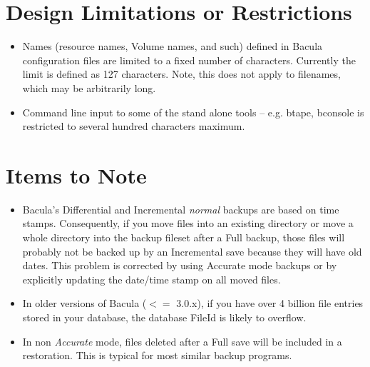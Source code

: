 \section{Design Limitations or Restrictions}

\begin{itemize}
\item Names (resource names, Volume names, and such) defined in Bacula 
   configuration files are limited to a fixed number of
   characters.  Currently the limit is defined as 127 characters.  Note,
   this does not apply to filenames, which may be arbitrarily long.
\item Command line input to some of the stand alone tools -- e.g. btape,
   bconsole is restricted to several hundred characters maximum.
\end{itemize}

\section{Items to Note}
\begin{itemize}
\item Bacula's Differential and Incremental \textsl{normal} backups are based
  on time stamps.  Consequently, if you move files into an existing directory
  or move a whole directory into the backup fileset after a Full backup, those
  files will probably not be backed up by an Incremental save because they will
  have old dates.  This problem is corrected by using Accurate mode backups
  or by explicitly updating the date/time stamp on all moved files.
\item In older versions of Bacula ($<=$ 3.0.x), if you have over 4 billion file
  entries stored in your database, the database FileId is likely to overflow.
\item In non \textsl{Accurate} mode, files deleted after a Full save will be
  included in a restoration. This is typical for most similar backup programs.
\end{itemize}
